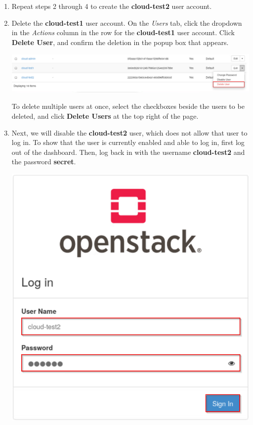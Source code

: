 \documentclass[letterpaper, 12pt]{article}
\begin{document}
\begin{enumerate}
    \item Repeat steps 2 through 4 to create the \textbf{cloud-test2} user account.

    \item Delete the \textbf{cloud-test1} user account.
    On the \textit{Users} tab, click the dropdown in the \textit{Actions} column in the row for the \textbf{cloud-test1} user account.
    Click \textbf{Delete User}, and confirm the deletion in the popup box that appears.

    \begin{center}
        \includegraphics[width=\linewidth]{images/part3/step9.png}
    \end{center}

    \begin{tipbox}
        To delete multiple users at once, select the checkboxes beside the users to be deleted, and click \textbf{Delete Users} at the top right of the page.
    \end{tipbox}

    \item Next, we will disable the \textbf{cloud-test2} user, which does not allow that user to log in.
    To show that the user is currently enabled and able to log in, first log out of the dashboard.
    Then, log back in with the username \textbf{cloud-test2} and the password \textbf{secret}.

    \begin{center}
        \includegraphics[scale=0.5]{images/part3/step10.png}
    \end{center}


\end{enumerate}
\end{document}
